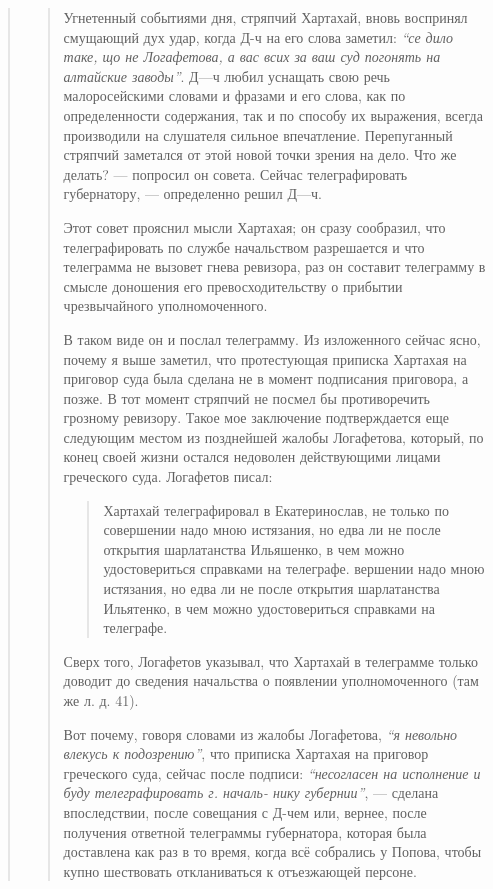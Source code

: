 \begin{quote}
\begin{quote}
Угнетенный событиями дня, стряпчий Хартахай, вновь воспринял смущающий дух
удар, когда Д-ч на его слова заметил: \emph{``се дило таке, що не Логафетова, а
вас всих за ваш суд погонять на алтайские заводы''}. Д—ч любил уснащать свою
речь малоросейскими словами и фразами и его слова, как по определенности
содержания, так и по способу их выражения, всегда производили на слушателя
сильное впечатление.  Перепуганный стряпчий заметался от этой новой точки
зрения на дело. Что же делать? — попросил он совета. Сейчас телеграфировать
губернатору, — определенно решил Д—ч.

Этот совет прояснил мысли Хартахая; он сразу
сообразил, что телеграфировать по службе начальством
разрешается и что телеграмма не вызовет гнева ревизора,
раз он составит телеграмму в смысле доношения его превосходительству о прибытии чрезвычайного
уполномоченного.
 
В таком виде он и послал телеграмму. Из изложенного сейчас ясно, почему я выше
заметил, что протестующая приписка Хартахая на приговор суда была сделана не в
момент подписания приговора, а позже. В тот момент стряпчий не посмел бы
противоречить грозному ревизору. Такое мое заключение подтверждается еще
следующим местом из позднейшей жалобы Логафетова, который, по конец своей жизни
остался недоволен действующими лицами греческого суда.
Логафетов писал: 

\begin{quote}
\em\bfseries	

Хартахай телеграфировал в Екатеринослав, не только по совершении надо мною
истязания, но едва ли не после открытия шарлатанства Ильяшенко, в чем
можно удостовериться справками на телеграфе.  вершении надо мною
истязания, но едва ли не после открытия шарлатанства Ильятенко, в чем
можно удостовериться справками на телеграфе. 

\end{quote}

Сверх того, Логафетов указывал, что Хартахай в телеграмме только доводит до сведения начальства о появлении уполномоченного
(там же л. д. 41).

Вот почему, говоря словами из жалобы Логафетова,
\emph{``я невольно влекусь к подозрению''}, что приписка Хартахая
на приговор греческого суда, сейчас после подписи: \emph{``несогласен на исполнение и буду телеграфировать г. началь-
нику губернии''}, — сделана впоследствии, после совещания с
Д-чем или, вернее, после получения ответной телеграммы
губернатора, которая была доставлена как раз в то время,
когда всё собрались у Попова, чтобы купно шествовать откланиваться к отъезжающей персоне.


\end{quote}
\end{quote}
